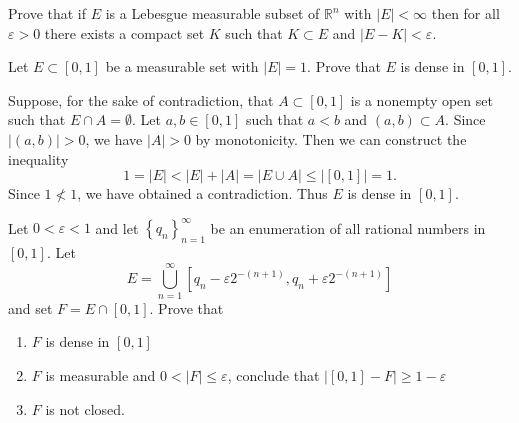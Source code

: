 
\begin{problem}{1}
  Prove that if $E$ is a Lebesgue measurable subset of $\mathbb{R}^{n}$ with $\left| E \right| < \infty$ then for all $\varepsilon > 0$ there exists a compact set $K$ such that $K \subset E$ and $\left| E - K \right| < \varepsilon$.
\end{problem}

\begin{solution}
\end{solution}

\pagebreak

\begin{problem}{2}
  Let $E \subset [0,1]$ be a measurable set with $\left| E \right| = 1$. Prove that $E$ is dense in $[0,1]$.
\end{problem}



\begin{solution}
  Suppose, for the sake of contradiction, that $A \subset [0,1]$ is a nonempty open set such that $E \cap A = \emptyset$.
  Let  $a,b \in [0,1]$ such that $a < b$ and $(a,b) \subset A$.
  Since $\left| (a,b) \right| > 0$, we have $\left| A \right|>0$ by monotonicity.
  Then we can construct the inequality 
  \[
    1 = \left| E \right| < \left| E \right| + \left| A \right| = \left| E \cup A \right| \leq \left| [0,1] \right| = 1
  .\] 
  Since $1 \not< 1$, we have obtained a contradiction.
  Thus $E$ is dense in $[0,1]$.
\end{solution}

\pagebreak

\begin{problem}{3}
  Let $0 < \varepsilon < 1$ and let $\left\{ q_{n} \right\}_{n=1}^{\infty}$ be an enumeration of all rational numbers in $[0,1]$.
  Let 
  \[
    E = \bigcup_{n=1}^{\infty}\left[q_{n} - \varepsilon 2^{-(n+1)}, q_{n} + \varepsilon 2^{-(n+1)}\right]
  \] 
  and set $F = E \cap [0,1]$. Prove that
  \begin{enumerate}
    \item $F$ is dense in $[0,1]$
    \item $F$ is measurable and $0 < \left| F \right| \leq \varepsilon$, conclude that $\left| [0,1] - F \right| \geq 1 - \varepsilon$ 
    \item $F$ is not closed.
  \end{enumerate}

\end{problem}


